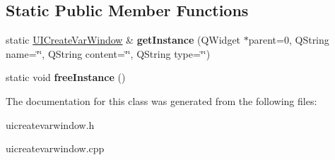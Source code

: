 \subsection*{Static Public Member Functions}
\begin{DoxyCompactItemize}
\item 
static \hyperlink{class_u_i_create_var_window}{U\+I\+Create\+Var\+Window} \& {\bfseries get\+Instance} (Q\+Widget $\ast$parent=0, Q\+String name=\char`\"{}\char`\"{}, Q\+String content=\char`\"{}\char`\"{}, Q\+String type=\char`\"{}\char`\"{})\hypertarget{class_u_i_create_var_window_a8d341769adf8848860b2c850f9b3a90f}{}\label{class_u_i_create_var_window_a8d341769adf8848860b2c850f9b3a90f}

\item 
static void {\bfseries free\+Instance} ()\hypertarget{class_u_i_create_var_window_a7c62f9117201ac440bb9ee8803bf96a6}{}\label{class_u_i_create_var_window_a7c62f9117201ac440bb9ee8803bf96a6}

\end{DoxyCompactItemize}


The documentation for this class was generated from the following files\+:\begin{DoxyCompactItemize}
\item 
uicreatevarwindow.\+h\item 
uicreatevarwindow.\+cpp\end{DoxyCompactItemize}
